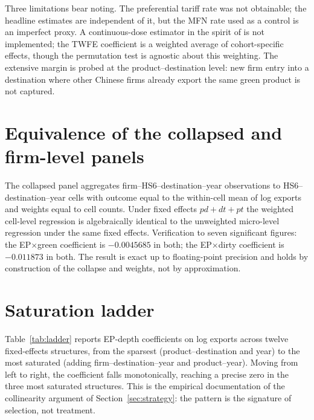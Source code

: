 \documentclass[12pt]{article}
\begin{document}
Three limitations bear noting. The preferential tariff rate was not obtainable; the headline
estimates are independent of it, but the MFN rate used as a control is an imperfect proxy.
A continuous-dose estimator in the spirit of \citet{callaway2024} is not implemented; the
TWFE coefficient is a weighted average of cohort-specific effects, though the permutation
test is agnostic about this weighting. The extensive margin is probed at the
product--destination level: new firm entry into a destination where other Chinese firms
already export the same green product is not captured.

\printbibliography

\appendix

\section{Equivalence of the collapsed and firm-level panels}\label{app:pddt}

The collapsed panel aggregates firm--HS6--destination--year observations to
HS6--destination--year cells with outcome equal to the within-cell mean of log exports
and weights equal to cell counts. Under fixed effects $pd + dt + pt$ the weighted
cell-level regression is algebraically identical to the unweighted micro-level regression
under the same fixed effects. Verification to seven significant figures: the
EP$\times$green coefficient is $-0.0045685$ in both; the EP$\times$dirty coefficient is
$-0.011873$ in both. The result is exact up to floating-point precision and holds by
construction of the collapse and weights, not by approximation.

\section{Saturation ladder}\label{app:ladder}

Table~\ref{tab:ladder} reports EP-depth coefficients on log exports across twelve
fixed-effects structures, from the sparsest (product--destination and year) to the most
saturated (adding firm--destination--year and product--year). Moving from left to right,
the coefficient falls monotonically, reaching a precise zero in the three most saturated
structures. This is the empirical documentation of the collinearity argument of
Section~\ref{sec:strategy}: the pattern is the signature of selection, not treatment.
\end{document}

